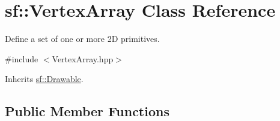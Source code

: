 \hypertarget{classsf_1_1_vertex_array}{\section{sf\+:\+:Vertex\+Array Class Reference}
\label{classsf_1_1_vertex_array}
}


Define a set of one or more 2\+D primitives.  




{\ttfamily \#include $<$Vertex\+Array.\+hpp$>$}



Inherits \hyperlink{classsf_1_1_drawable}{sf\+::\+Drawable}.

\subsection*{Public Member Functions}
